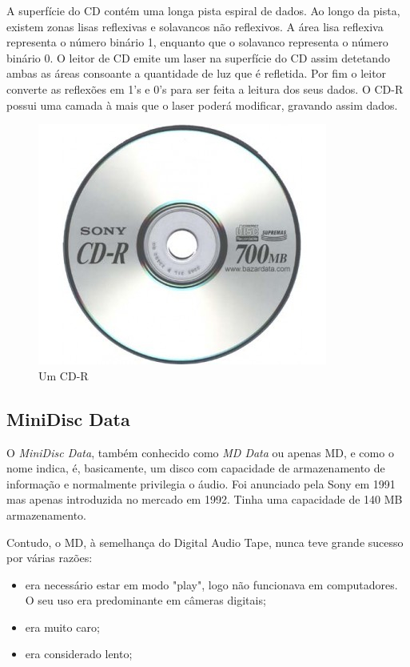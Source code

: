 \documentclass{report}
\begin{document}
	A superfície do CD contém uma longa pista espiral de dados. Ao longo da pista, existem zonas lisas reflexivas e solavancos não reflexivos. A área lisa reflexiva representa o número binário 1, enquanto que o solavanco representa o número binário 0. O leitor de CD emite um laser na superfície do CD assim detetando ambas as áreas consoante a quantidade de luz que é refletida. Por fim o leitor converte as reflexões em 1's e 0's para ser feita a leitura dos seus dados. O CD-R possui uma camada à mais que o laser poderá modificar, gravando assim dados.
\vspace{1mm}

	\begin{figure} [h]
		\centering
		\includegraphics[scale=0.4]{cd-r.jpg}
		\caption{Um CD-R}
	\end{figure}

\newpage

		\subsection{MiniDisc Data}
		O 	\textit{MiniDisc Data}, também conhecido como \textit{MD Data} ou apenas MD, e como o nome indica, é, basicamente, um disco com capacidade de armazenamento de informação e normalmente privilegia o áudio. Foi anunciado pela Sony em 1991 mas apenas introduzida no mercado em 1992. 
Tinha uma capacidade de 140 MB armazenamento.

	Contudo, o MD, à semelhança do Digital Audio Tape, nunca teve grande sucesso por várias razões:
	\begin{itemize} 
		\item era necessário estar em modo "play", logo não funcionava em computadores. O seu uso era predominante em câmeras digitais; 
		\item era muito caro;
		\item era considerado lento;
	\end{itemize} 
	
\end{document}
